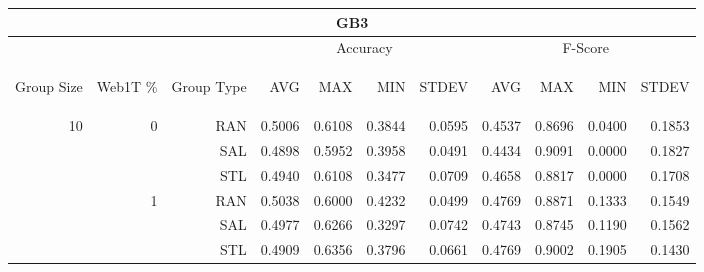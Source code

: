 \begin{center}
\begin{table}[htbp] 
 \begin{center}
\begin{tabular}{ | r | r | r | r | r | r | r | r | r | r | r |}
\hline
\multicolumn{11}{|c|}{GB3}\\
\hline
 & & & \multicolumn{4}{|c|}{Accuracy} & \multicolumn{4}{|c|}{F-Score}\\ \cline{4-11}
\begin{sideways}Group Size\end{sideways} & \begin{sideways}Web1T \%\end{sideways} & \begin{sideways}Group Type\end{sideways} & \begin{sideways}AVG\end{sideways} & \begin{sideways}MAX\end{sideways} & \begin{sideways}MIN\end{sideways} & \begin{sideways}STDEV\end{sideways} & \begin{sideways}AVG\end{sideways} & \begin{sideways}MAX\end{sideways} & \begin{sideways}MIN\end{sideways} & \begin{sideways}STDEV\end{sideways}\\
\hline
\multirow{18}{*}{10}
 & \multirow{3}{*}{0} & RAN & 0.5006 & 0.6108 & 0.3844 & 0.0595 & 0.4537 & 0.8696 & 0.0400 & 0.1853\\ \cline{3-11}
 &   & SAL & 0.4898 & 0.5952 & 0.3958 & 0.0491 & 0.4434 & 0.9091 & 0.0000 & 0.1827\\ \cline{3-11}
 &   & STL & 0.4940 & 0.6108 & 0.3477 & 0.0709 & 0.4658 & 0.8817 & 0.0000 & 0.1708\\ \cline{2-11}
 & \multirow{3}{*}{1} & RAN & 0.5038 & 0.6000 & 0.4232 & 0.0499 & 0.4769 & 0.8871 & 0.1333 & 0.1549\\ \cline{3-11}
 &   & SAL & 0.4977 & 0.6266 & 0.3297 & 0.0742 & 0.4743 & 0.8745 & 0.1190 & 0.1562\\ \cline{3-11}
 &   & STL & 0.4909 & 0.6356 & 0.3796 & 0.0661 & 0.4769 & 0.9002 & 0.1905 & 0.1430\\ \cline{2-11}

\end{tabular}
\end{center}
\end{table}
\end{center}
